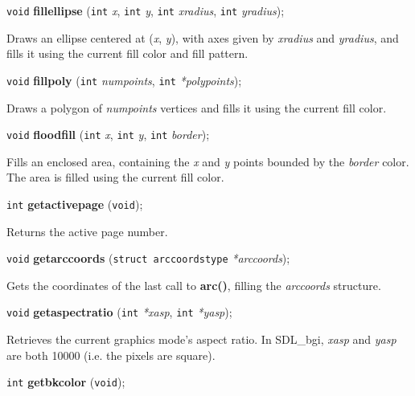 \documentclass[a4paper,11pt]{article}
\newcommand{\SDLbgi}{SDL\_bgi}
\newcommand{\V}{\texttt{void}}      %
\newcommand{\I}{\texttt{int}}       %
\newcommand{\func}[1]{\textbf{#1}}  %
\newcommand{\A}[1]{\emph{#1}}       %
\newenvironment{bgi}
{ %
  \begin{snugshade}
}
{ %
  \end{snugshade}
}
\begin{document}

\begin{bgi}
\V{} \func{fillellipse} (\I{} \A{x}, \I{} \A{y}, \I{} \A{xradius},
\I{} \A{yradius});
\end{bgi}

Draws an ellipse centered at (\A{x}, \A{y}), with axes given by
\A{xradius} and \A{yradius}, and fills it using the current fill
color and fill pattern.


\begin{bgi}
\V{} \func{fillpoly} (\I{} \A{numpoints}, \I{} \A{*polypoints});
\end{bgi}

Draws a polygon of \A{numpoints} vertices and fills it using the
current fill color.


\begin{bgi}
\V{} \func{floodfill} (\I{} \A{x}, \I{} \A{y}, \I{} \A{border});
\end{bgi}

Fills an enclosed area, containing the \A{x} and \A{y} points bounded
by the \A{border} color. The area is filled using the current fill
color.


\begin{bgi}
\I{} \func{getactivepage} (\V{});
\end{bgi}

Returns the active page number.


\begin{bgi}
\V{} \func{getarccoords} (\texttt{struct arccoordstype} \A{*arccoords});
\end{bgi}

Gets the coordinates of the last call to \func{arc()}, filling the
\A{arccoords} structure.


\begin{bgi}
\V{} \func{getaspectratio} (\I{} \A{*xasp}, \I{} \A{*yasp});
\end{bgi}

Retrieves the current graphics mode's aspect ratio. In \SDLbgi,
\A{xasp} and \A{yasp} are both 10000 (i.e. the pixels are square).


\begin{bgi}
\I{} \func{getbkcolor} (\V{});
\end{bgi}
\end{document}
